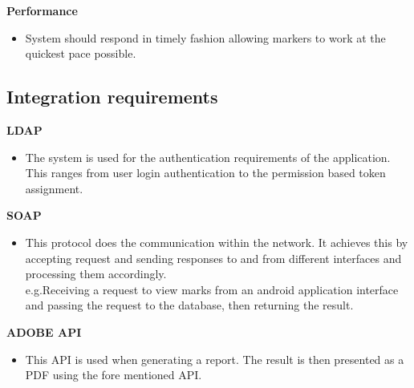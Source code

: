 \documentclass[10pt,a4paper]{article}
\begin{document}
\indent\textbf{Performance}         
        \begin{itemize}
                \item System should respond in timely fashion allowing markers to work at the quickest pace possible.
        \end{itemize}  
 
\subsection{Integration requirements}
	\indent\indent\textbf{LDAP}
    \begin{itemize}
                \item The system is used for the authentication requirements of the application.\\This ranges from user login authentication to the permission based token assignment.
    \end{itemize}
    
	\textbf{SOAP}
    \begin{itemize}
                \item This protocol does the communication within the network. It achieves this by accepting request and sending responses to and from different interfaces and processing them accordingly.\\e.g.Receiving a request to view marks from an android application interface and passing the request to the database, then returning the result.  
    \end{itemize}   
    
	\textbf{ADOBE API}
    \begin{itemize}
                \item This API is used when generating a report. The result is then presented as a PDF using the fore mentioned API. 
    \end{itemize}   
\end{document}
